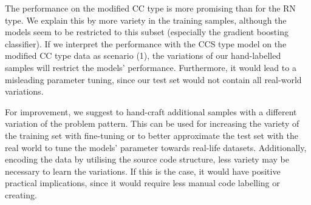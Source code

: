 The performance on the modified CC type is more promising than for the RN type. We explain this by more variety in the training samples, although the models seem to be restricted to this subset (especially the gradient boosting classifier). If we interpret the performance with the CCS type model on the modified CC type data as scenario (1), the variations of our hand-labelled samples will restrict the models' performance. Furthermore, it would lead to a misleading parameter tuning, since our test set would not contain all real-world variations.

For improvement, we suggest to hand-craft additional samples with a different variation of the problem pattern. This can be used for increasing the variety of the training set with fine-tuning or to better approximate the test set with the real world to tune the models' parameter towards real-life datasets. Additionally, encoding the data by utilising the source code structure, less variety may be necessary to learn the variations. If this is the case, it would have positive practical implications, since it would require less manual code labelling or creating.



